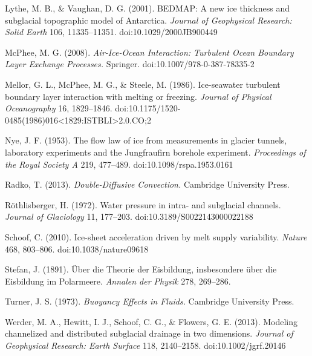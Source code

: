 \documentclass[11pt]{article}
\begin{document}
Lythe, M. B., \& Vaughan, D. G. (2001). BEDMAP: A new ice thickness and subglacial topographic model of Antarctica. \emph{Journal of Geophysical Research: Solid Earth} 106, 11335–11351. doi:10.1029/2000JB900449


McPhee, M. G. (2008). \emph{Air-Ice-Ocean Interaction: Turbulent Ocean Boundary Layer Exchange Processes.} Springer. doi:10.1007/978-0-387-78335-2


Mellor, G. L., McPhee, M. G., \& Steele, M. (1986). Ice-seawater turbulent boundary layer interaction with melting or freezing. \emph{Journal of Physical Oceanography} 16, 1829–1846. doi:10.1175/1520-0485(1986)016<1829:ISTBLI>2.0.CO;2


Nye, J. F. (1953). The flow law of ice from measurements in glacier tunnels, laboratory experiments and the Jungfraufirn borehole experiment. \emph{Proceedings of the Royal Society A} 219, 477–489. doi:10.1098/rspa.1953.0161


Radko, T. (2013). \emph{Double-Diffusive Convection.} Cambridge University Press.


Röthlisberger, H. (1972). Water pressure in intra- and subglacial channels. \emph{Journal of Glaciology} 11, 177–203. doi:10.3189/S0022143000022188


Schoof, C. (2010). Ice-sheet acceleration driven by melt supply variability. \emph{Nature} 468, 803–806. doi:10.1038/nature09618


Stefan, J. (1891). Über die Theorie der Eisbildung, insbesondere über die Eisbildung im Polarmeere. \emph{Annalen der Physik} 278, 269–286.


Turner, J. S. (1973). \emph{Buoyancy Effects in Fluids.} Cambridge University Press.


Werder, M. A., Hewitt, I. J., Schoof, C. G., \& Flowers, G. E. (2013). Modeling channelized and distributed subglacial drainage in two dimensions. \emph{Journal of Geophysical Research: Earth Surface} 118, 2140–2158. doi:10.1002/jgrf.20146
\end{document}
